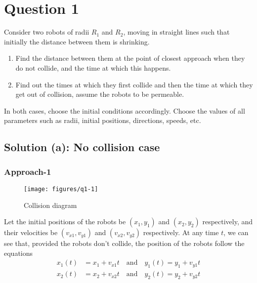 \section*{Question 1}

Consider two robots of radii \( R_1 \) and \( R_2 \), moving in straight lines such that initially the distance between them is shrinking.
\begin{enumerate}[label= (\alph*), noitemsep, topsep=0pt]
    \item Find the distance between them at the point of closest approach when they do not collide, and the time at which this happens.
    \item Find out the times at which they first collide and then the time at which they get out of collision, assume the robots to be permeable.
\end{enumerate}
In both cases, choose the initial conditions accordingly. Choose the values of all parameters such as radii, initial positions, directions, speeds, etc.

\vspace*{-1em}
\subsection*{Solution (a): No collision case}

\vspace*{-1em}
\subsubsection*{Approach-1}

\vspace*{-3em}
\begin{figure}[htbp]
    \centering
    \texttt{[image: figures/q1-1]}
    \vspace*{-3em}
    \caption{
        Collision diagram
    }\label{fig:q1-1}
\end{figure}

Let the initial positions of the robots be \( (x_1, y_1) \) and \( (x_2, y_2) \) respectively, and their velocities be \( (v_{x1}, v_{y1}) \) and \( (v_{x2}, v_{y2}) \) respectively.
At any time \( t \), we can see that, provided the robots don't collide, the position of the robots follow the equations
\begin{align*}
    x_1(t) & = x_1 + v_{x1}t \quad \text{and} \quad y_1(t) = y_1 + v_{y1}t \\
    x_2(t) & = x_2 + v_{x2}t \quad \text{and} \quad y_2(t) = y_2 + v_{y2}t
\end{align*}

